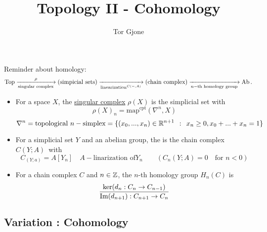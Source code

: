 \documentclass[a4paper,11pt,english]{article}
\title{\textbf{Topology II - Cohomology}}
\author{Tor Gjone}
\begin{document}
\mmaketitle




\def \map {\text{map}}
\def \mapcts {\map^{\text{cpt}}}

Reminder about homology:
\[ \operatorname{Top} \xrightarrow[\text{singular complex}]{\rho} (\text{simpicial sets}) 
\xrightarrow[\text{linearization}^{C(-,A)}]{} (\text{chain complex}) 
\xrightarrow[n-\text{th homology group}]{}  \operatorname{Ab}. \]

\begin{itemize}
\item For a space $X$, the \underline{singular complex} $\rho(X)$ is the
simplicial set with 
\[ \rho(X)_n = \mapcts(\nabla^n, X) \]
\[ \nabla^n = \text{topological } n-\text{simplex} = \{ (x_0, ..., x_n) \in
\mathbb{R}^{n+1} \:\::\:\: x_n \ge 0, x_0 + ... + x_n = 1 \} \]
\item For a simplicial set $Y$ and an abelian group, the 
is the chain complex $C(Y; A)$ with 
\[ C_(Y;a) = A[Y_n] \quad A-\text{linarization of} Y_n \qquad ( C_n(Y;A) = 0
\quad\text{for } n<0) \]
\item For a chain complex $C$ and $n \in \mathbb{Z}$, the $n$-th homology group
$H_n(C)$ is 
\[ \frac{\ker(d_n : C_n \to C_{n-1})}{\operatorname{Im}(d_{n+1}) : C_{n+1} \to C_n}  \]
\end{itemize}


\subsection{Variation : Cohomology}
\end{document}
